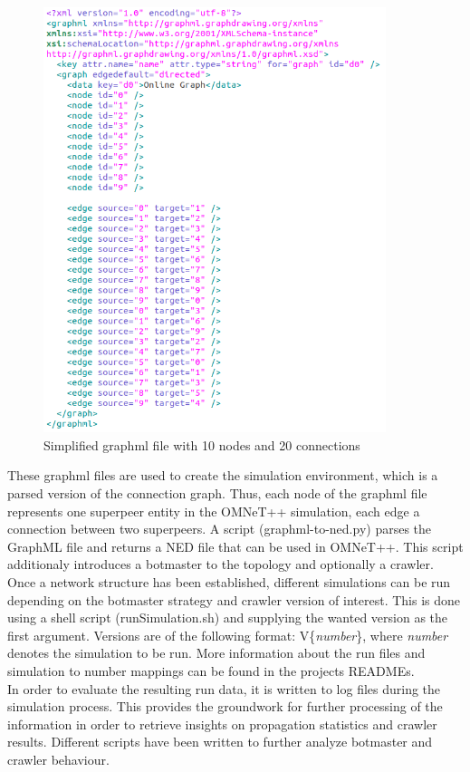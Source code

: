 \documentclass{article}
\begin{document}
\begin{figure}[H]
    \centering
    \includegraphics[width=10cm]{GraphmlExample.png}
    \caption{Simplified graphml file with 10 nodes and 20 connections}
    \label{fig:SimplifiedGraphml}
\end{figure}

These graphml files are used to create the simulation environment, which is a parsed version of the connection graph. Thus, each node of the graphml file represents one superpeer entity in the OMNeT++ simulation, each edge a connection between two superpeers. A script (graphml-to-ned.py) parses the GraphML file and returns a NED file that can be used in OMNeT++. This script additionaly introduces a botmaster to the topology and optionally a crawler. \\

Once a network structure has been established, different simulations can be run depending on the botmaster strategy and crawler version of interest. This is done using a shell script (runSimulation.sh) and supplying the wanted version as the first argument. Versions are of the following format: V\{\emph{number}\}, where \emph{number} denotes the simulation to be run. More information about the run files and simulation to number mappings can be found in the projects READMEs. \\

In order to evaluate the resulting run data, it is written to log files during the simulation process. This provides the groundwork for further processing of the information in order to retrieve insights on propagation statistics and crawler results. Different scripts have been written to further analyze botmaster and crawler behaviour.
\end{document}
